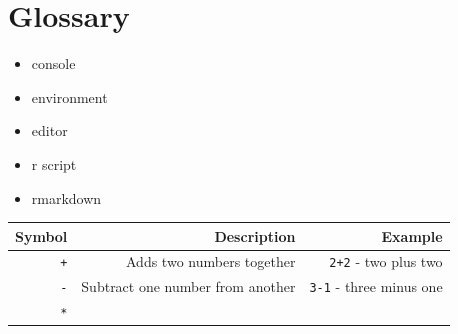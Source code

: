 \documentclass[]{book}
\providecommand{\tightlist}{%
  \setlength{\itemsep}{0pt}\setlength{\parskip}{0pt}}
\begin{document}
\hypertarget{glossary}{%
\section*{Glossary}\label{glossary}}

\begin{itemize}
\tightlist
\item
  console
\item
  environment
\item
  editor
\item
  r script
\item
  rmarkdown
\end{itemize}

\begin{longtable}[]{@{}rrr@{}}
\toprule
\begin{minipage}[b]{0.30\columnwidth}\raggedleft
Symbol\strut
\end{minipage} & \begin{minipage}[b]{0.30\columnwidth}\raggedleft
Description\strut
\end{minipage} & \begin{minipage}[b]{0.30\columnwidth}\raggedleft
Example\strut
\end{minipage}\tabularnewline
\midrule
\endhead
\begin{minipage}[t]{0.30\columnwidth}\raggedleft
\texttt{+}\strut
\end{minipage} & \begin{minipage}[t]{0.30\columnwidth}\raggedleft
Adds two numbers together\strut
\end{minipage} & \begin{minipage}[t]{0.30\columnwidth}\raggedleft
\texttt{2+2} - two plus two\strut
\end{minipage}\tabularnewline
\begin{minipage}[t]{0.30\columnwidth}\raggedleft
\texttt{-}\strut
\end{minipage} & \begin{minipage}[t]{0.30\columnwidth}\raggedleft
Subtract one number from another\strut
\end{minipage} & \begin{minipage}[t]{0.30\columnwidth}\raggedleft
\texttt{3-1} - three minus one\strut
\end{minipage}\tabularnewline
\begin{minipage}[t]{0.30\columnwidth}\raggedleft
\texttt{*}\strut
\end{minipage} & \begin{minipage}[t]{0.30\columnwidth}\raggedleft

\end{minipage}
\end{longtable}
\end{document}
